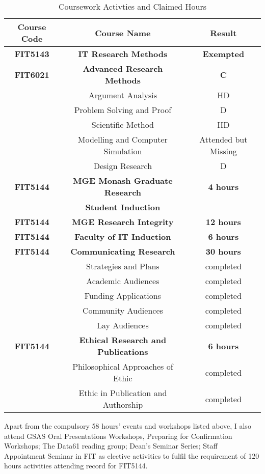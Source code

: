 \begin{table}[h]
\centering
\begin{tabular}{|c|c|c|}
\hline
\bf Course Code & \bf Course Name & \bf Result \\ \hline
\bf FIT5143 & \bf IT Research Methods & \bf Exempted \\ \hline
\bf  FIT6021 & \bf Advanced Research Methods & \bf C \\ \hline
& Argument Analysis & HD \\ \hline
& Problem Solving and Proof & D \\ \hline
& Scientific Method & HD \\ \hline
& Modelling and Computer Simulation & Attended but Missing \\ \hline
& Design Research & D \\ \hline
\bf FIT5144 & \bf MGE Monash Graduate Research & \bf 4 hours \\ 
& \bf Student Induction &  \\ \hline
\bf FIT5144 & \bf MGE  Research Integrity & \bf 12 hours \\ \hline
\bf FIT5144 & \bf Faculty of IT Induction & \bf 6 hours \\ \hline
\bf FIT5144 & \bf Communicating Research & \bf 30 hours\\ \hline
& Strategies and Plans & completed \\ \hline
& Academic Audiences & completed \\ \hline
& Funding Applications & completed \\ \hline
& Community Audiences & completed \\ \hline
& Lay Audiences & completed \\ \hline
\bf FIT5144 & \bf Ethical Research and Publications & \bf 6 hours\\ \hline
& Philosophical Approaches of Ethic & completed \\ \hline
& Ethic in Publication and Authorship & completed \\ \hline
\end{tabular}
\caption{Coursework Activties and Claimed Hours}
\label{tlb:coursework}
\end{table}

Apart from the compulsory 58 hours' events and workshops listed above, I also attend GSAS Oral Presentations Workshops, Preparing for Confirmation Workshops; The Data61 reading group; Dean's Seminar Series; Staff Appointment Seminar in FIT as elective activities to fulfil the requirement of 120 hours activities attending record for FIT5144.
